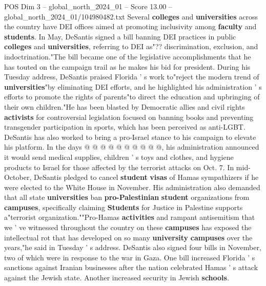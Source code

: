 \begin{textsample}{POS Dim 3 – global\_north\_2024\_01 – Score 13.00 – global\_north\_2024\_01/104980482.txt}
Several \textbf{colleges} and \textbf{universities} across the country have DEI offices aimed at promoting inclusivity among \textbf{faculty} and \textbf{students}.
In May, DeSantis signed a bill banning DEI practices in public \textbf{colleges} and \textbf{universities}, referring to DEI as"?? discrimination, exclusion, and indoctrination."The bill became one of the legislative accomplishments that he has touted on the campaign trail as he makes his bid for president.
During his Tuesday address, DeSantis praised Florida ' s work to"reject the modern trend of \textbf{universities}"by eliminating DEI efforts, and he highlighted his administration ' s efforts to promote the rights of parents"to direct the education and upbringing of their own children."He has been blasted by Democratic allies and civil rights \textbf{activists} for controversial legislation focused on banning books and preventing transgender participation in sports, which has been perceived as anti-LGBT.
DeSantis has also worked to bring a pro-Israel stance to his campaign to elevate his platform.
In the days @ @ @ @ @ @ @ @ @ @, his administration announced it would send medical supplies, children ' s toys and clothes, and hygiene products to Israel for those affected by the terrorist attacks on Oct. 7.
In mid-October, DeSantis pledged to cancel \textbf{student} \textbf{visas} of Hamas sympathizers if he were elected to the White House in November.
His administration also demanded that all state \textbf{universities} ban \textbf{pro-Palestinian} \textbf{student} organizations from \textbf{campuses}, specifically claiming \textbf{Students} for Justice in Palestine supports a"terrorist organization.""Pro-Hamas \textbf{activities} and rampant antisemitism that we ' ve witnessed throughout the country on these \textbf{campuses} has exposed the intellectual rot that has developed on so many \textbf{university} \textbf{campuses} over the years,"he said in Tuesday ' s address.
DeSantis also signed four bills in November, two of which were in response to the war in Gaza.
One bill increased Florida ' s sanctions against Iranian businesses after the nation celebrated Hamas ' s attack against the Jewish state.
Another increased security in Jewish \textbf{schools}.

\end{textsample}
